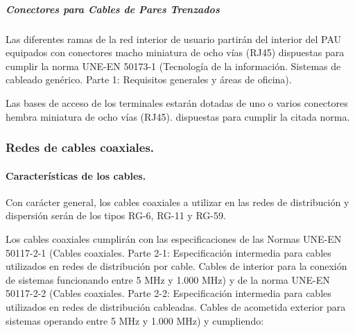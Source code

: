 \subparagraph{Conectores para Cables de Pares Trenzados}
Las diferentes ramas de la red interior de usuario partirán del interior del PAU equipados con conectores macho miniatura de ocho vías (RJ45) dispuestas para cumplir la norma UNE-EN 50173-1 (Tecnología de la información. Sistemas de cableado genérico. Parte 1: Requisitos generales y áreas de oficina).

Las bases de acceso de los terminales estarán dotadas de uno o varios conectores hembra miniatura de ocho vías (RJ45). dispuestas para cumplir la citada norma.

\subsubsection{Redes de cables coaxiales.}
\paragraph{Características de los cables.}
Con carácter general, los cables coaxiales a utilizar en las redes de distribución y dispersión serán de los tipos RG-6, RG-11 y RG-59.

Los cables coaxiales cumplirán con las especificaciones de las Normas UNE-EN 50117-2-1 (Cables  coaxiales. Parte 2-1: Especificación intermedia para cables utilizados en redes de distribución por cable. Cables de interior para la conexión de sistemas funcionando entre 5 MHz y 1.000 MHz) y de la norma UNE-EN 50117-2-2 (Cables coaxiales. Parte 2-2: Especificación intermedia para cables utilizados en redes de distribución cableadas. Cables de acometida exterior para sistemas operando entre 5 MHz y 1.000 MHz) y cumpliendo:

